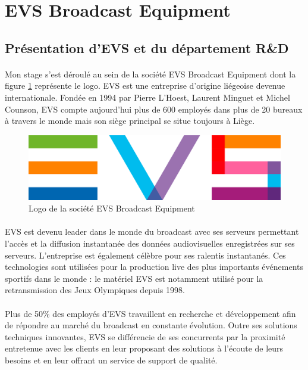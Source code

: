 \documentclass{article}
\begin{document}

    \newpage
    \section{EVS Broadcast Equipment}
    \subsection{Présentation d'EVS et du département R\&D}
    \paragraph{}
    Mon stage s'est déroulé au sein de la société EVS Broadcast Equipment dont la figure \ref{fig:logo} représente le logo. EVS est une entreprise d'origine liégeoise devenue internationale. Fondée en 1994 par Pierre L'Hoest, Laurent Minguet et Michel Counson, EVS compte aujourd'hui plus de 600 employés dans plus de 20 bureaux à travers le monde mais son siège principal se situe toujours à Liège\cite{EVS:website}.

    \begin{figure}[H]
        \centering
        \includegraphics[width=.5\linewidth]{./images/EVS-logo.png}
        \caption{Logo de la société EVS Broadcast Equipment}
        \label{fig:logo}
    \end{figure}

    \paragraph{}
    EVS est devenu leader dans le monde du broadcast avec ses serveurs permettant l'accès et la diffusion instantanée des données audiovisuelles enregistrées sur ses serveurs. L'entreprise est également célèbre pour ses ralentis instantanés. Ces technologies sont utilisées pour la production live des plus importants événements sportifs dans le monde : le matériel EVS est notamment utilisé pour la retransmission des Jeux Olympiques depuis 1998.

    \paragraph{}
    Plus de 50\% des employés d'EVS travaillent en recherche et développement afin de répondre au marché du broadcast en constante évolution. Outre ses solutions techniques innovantes, EVS se différencie de ses concurrents par la proximité entretenue avec les clients en leur proposant des solutions à l'écoute de leurs besoins et en leur offrant un service de support de qualité.
\end{document}
